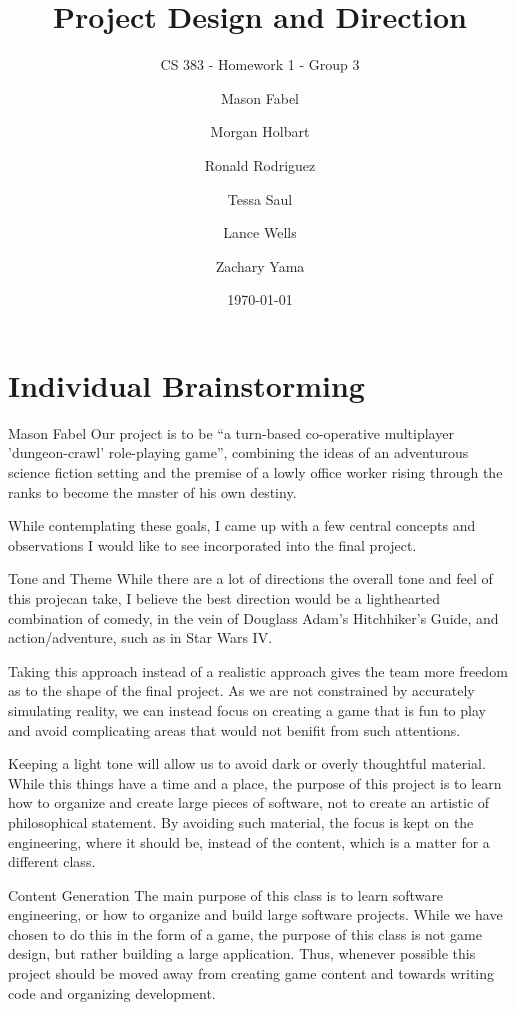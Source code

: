 \documentclass[12pt]{report}
\title{Project Design and Direction}
\subtitle{CS 383 - Homework 1 - Group 3}
\author{
Mason Fabel \\
\and Morgan Holbart \\
\and Ronald Rodriguez \\
\and Tessa Saul \\
\and Lance Wells \\
\and Zachary Yama \\
}
\date{\today}
\begin{document}
\maketitle

\chapter{Individual Brainstorming}

\begin{section}{Mason Fabel}
Our project is to be ``a turn-based co-operative multiplayer
'dungeon-crawl' role-playing game'', combining the ideas of an adventurous
science fiction setting and the premise of a lowly office worker rising
through the ranks to become the master of his own destiny.

While contemplating these goals, I came up with a few central concepts and
observations I would like to see incorporated into the final project.

\begin{subsection}{Tone and Theme}
While there are a lot of directions the overall tone and feel of this projecan take, I believe the best direction would be a lighthearted combination of comedy, in the vein of Douglass Adam's Hitchhiker's Guide, and
action/adventure, such as in Star Wars IV.

Taking this approach instead of a realistic approach gives the team more
freedom as to the shape of the final project. As we are not constrained by
accurately simulating reality, we can instead focus on creating a game that
is fun to play and avoid complicating areas that would not benifit from
such attentions.

Keeping a light tone will allow us to avoid dark or overly thoughtful
material. While this things have a time and a place, the purpose
of this project is to learn how to organize and create large pieces of
software, not to create an artistic of philosophical statement. By avoiding
such material, the focus is kept on the engineering, where it should be,
instead of the content, which is a matter for a different class.
\end{subsection}

\begin{subsection}{Content Generation}
The main purpose of this class is to learn software engineering, or how
to organize and build large software projects. While we have chosen to do
this in the form of a game, the purpose of this class is not game design,
but rather building a large application. Thus, whenever possible this
project should be moved away from creating game content and towards writing
code and organizing development.


\end{subsection}
\end{section}
\end{document}

